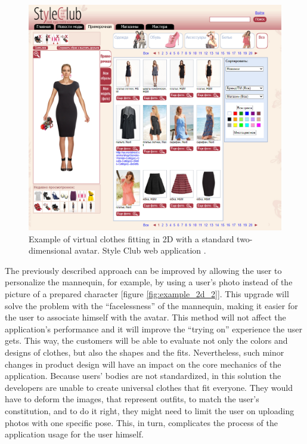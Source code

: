 \documentclass[a4paper]{report}
\begin{document}
\begin{figure}[H]
  \includegraphics[width=\textwidth, keepaspectratio]{images/VFR/VFR_example_2D_1.png}
  \caption{Example of virtual clothes fitting in 2D with a standard two-dimensional avatar. Style Club web application \cite{styleclub}.}
  \label{fig:example_2d_1}
\end{figure}

\bigskip  The previously described approach can be improved by allowing the user to personalize the mannequin, for example, by using a user’s photo instead of the picture of a prepared character [figure \ref{fig:example_2d_2}]. This upgrade will solve the problem with the “facelessness” of the mannequin, making it easier for the user to associate himself with the avatar. This method will not affect the application’s performance and it will improve the “trying on” experience the user gets. This way, the customers will be able to evaluate not only the colors and designs of clothes, but also the shapes and the fits. Nevertheless, such minor changes in product design will have an impact on the core mechanics of the application. Because users’ bodies are not standardized, in this solution the developers are unable to create universal clothes that fit everyone. They would have to deform the images, that represent outfits, to match the user's constitution, and to do it right, they might need to limit the user on uploading photos with one specific pose. This, in turn, complicates the process of the application usage for the user himself.
\end{document}
